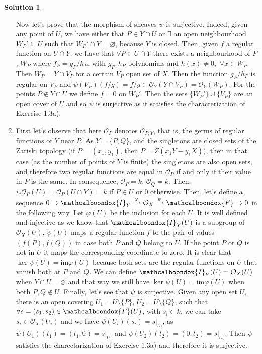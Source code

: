 \documentclass[12pt]{article}
\newcommand{\ima}{\ensuremath{\mathrm{im}}}
\newcommand{\locO}{\ensuremath{\mathcal{O}}}
\theoremstyle{definition}
\newtheorem*{sol}{Solution}
\newcommand{\sF}{\ensuremath{\mathcalboondox{F}}}
\newcommand{\sI}{\ensuremath{\mathcalboondox{I}}}
\begin{document}
\begin{sol}
\begin{enumerate}[label = \alph*)]
		Now let's prove that the morphism of sheaves $\psi$ is surjective. Indeed, given any point of $U$, we have either that $P \in Y \cap U$ or $\exists$ an open neighbourhood $W_P' \subseteq U$ such that $W_P' \cap Y = \varnothing$, because $Y$ is closed. Then, given $f$ a regular function on $U \cap Y$, we have that $\forall P \in U \cap Y$ there exists a neighbourhood of $P$, $W_P$ where $f_P = g_P/h_P$, with $g_P,h_P$ polynomials and $h(x) \neq 0, \, \, \forall x \in W_P$. Then $W_P = Y \cap V_P$ for a certain $V_P$ open set of $X$. Then the function $g_P/h_P$ is regular on $V_P$ and $\psi(V_P)(f/g) = f/g \in \locO_Y(Y \cap V_P) = \locO_Y(W_P)$. For the points $P \notin Y \cap U$ we define $f = 0$ on $W_P'$. Then the sets $\{W_P'\} \cup \{V_P\}$ are an open cover of $U$ and so $\psi$ is surjective as it satisfies the characterization of Exercise 1.3a).

		\item First let's observe that here $\locO_P$ denotes $\locO_{P,Y}$, that is, the germs of regular functions of $Y$ near $P$. As $Y = \{P,Q\}$, and the singletons are closed sets of the Zariski topology (if $P = (x_1,y_1)$, then $P = Z(x_1Y-y_1X)$), then in that case (as the number of points of $Y$ is finite) the singletons are also open sets, and therefore two regular functions are equal in $\locO_P$ if and only if their value in $P$ is the same. In consequence, $\locO_P = k$, $\locO_Q = k$. Then, $i_*\locO_P(U) = \locO_P(U \cap Y) = k$ if $P \in U$ or 0 otherwise. Then, let's define a sequence $0 \xrightarrow{} \sI_Y \xrightarrow{\varphi} \locO_X \xrightarrow{\psi} \sF \xrightarrow{} 0$ in the following way.
		Let $\varphi(U)$ be the inclusion for each $U$. It is well defined and injective as we know that $\sI_Y(U)$ is a subgroup of $\locO_X(U)$. $\psi(U)$ maps a regular function $f$ to the pair of values $(f(P),f(Q))$ in case both $P$ and $Q$ belong to $U$. If the point $P$ or $Q$ is not in $U$ it maps the corresponding coordinate to zero. It is clear that $\ker \psi(U) = \ima \varphi(U)$ because both sets are the regular functions on $U$ that vanish both at $P$ and $Q$. We can define $\sI_Y(U) = \locO_X(U)$ when $Y \cap U = \varnothing$ and that way we still have $\ker \psi(U) = \ima \varphi(U)$ when both $P,Q \notin U$. Finally, let's see that $\psi$ is surjective. Given any open set $U$, there is an open covering $U_1 = U \setminus \{P\}$, $U_2 = U \setminus \{Q\}$, such that $\forall s = (s_1, s_2) \in \sF(U)$, with $s_i \in k$, we can take $s_i \in \locO_X(U_i)$ and we have $\psi(U_i)(s_i) = s|_{U_i}$, as $\psi(U_1)(t_1) = (t_1,0) = s|_{U_1}$ and $\psi(U_2)(t_2) = (0,t_2) = s|_{U_2}$. Then $\psi$ satisfies the charectarization of Exercise 1.3a) and therefore it is surjective.


\end{enumerate}
\end{sol}
\end{document}
